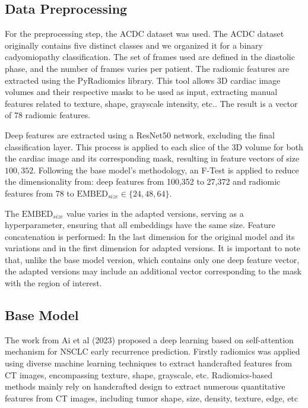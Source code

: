 \documentclass[journal,twoside,web]{ieeecolor}
\begin{document}
\subsection{Data Preprocessing}

For the preprocessing step, the ACDC dataset was used. The ACDC dataset originally contains five distinct classes and we organized it for a binary cadyomiopathy classification. The set of frames used are defined in the diastolic phase, and the number of frames varies per patient. The radiomic features are extracted using the PyRadiomics library. This tool allows 3D cardiac image volumes and their respective masks to be used as input, extracting manual features related to texture, shape, grayscale intensity, etc.. The result is a vector of $78$ radiomic features.

Deep features are extracted using a ResNet50 network, excluding the final classification layer. This process is applied to each slice of the 3D volume for both the cardiac image and its corresponding mask, resulting in feature vectors of size $100,352$. Following the base model's methodology, an F-Test is applied to reduce the dimensionality from: deep features from 100,352 to 27,372 and radiomic features from 78 to $\text{EMBED}_{size} \in \{24, 48, 64\}$.

The $\text{EMBED}_{size}$ value varies in the adapted versions, serving as a hyperparameter, ensuring that all embeddings have the same size. Feature concatenation is performed: In the last dimension for the original model and its variations and in the first dimension for adapted versions. It is important to note that, unlike the base model version, which contains only one deep feature vector, the adapted versions may include an additional vector corresponding to the mask with the region of interest.

\subsection{Base Model}

The work from Ai et al (2023) proposed a deep learning based on self-attention mechanism for \gls{NSCLC} early recurrence prediction. Firstly radiomics was applied using diverse machine learning techniques to extract handcrafted features from \gls{CT} images, encompassing texture, shape, grayscale, etc. Radiomics-based methods mainly rely on handcrafted design to extract numerous quantitative  features from \gls{CT} images, including tumor shape, size, density,  texture, edge, etc \cite{aiSelfAttentionBasedFusion2023}
\end{document}
